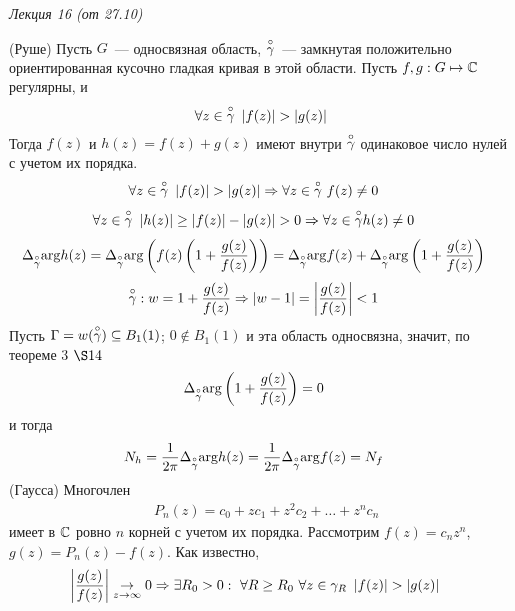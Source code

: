 \begin{flushright}
    \textit{Лекция 16 (от 27.10)}
\end{flushright}
\theorem (Руше)
Пусть $G$~--- односвязная область, $\overset{\circ}{\gamma}$~--- замкнутая положительно
ориентированная кусочно гладкая кривая в этой области. Пусть $f,g: G \mapsto
\mathbb{C}$ регулярны, и
\begin{equation}\label{(20.3)}
    \forall z \in \overset{\circ}{\gamma} \ \left| f(z) \right| > \left| g(z) \right|
\end{equation}
Тогда $f(z)$ и $h(z) = f(z)+g(z)$ имеют внутри $\overset{\circ}{\gamma}$ одинаковое число нулей
с учетом их порядка.
\pr
\begin{align*}
  & \forall z \in \overset{\circ}{\gamma} \ \left| f(z) \right| > \left| g(z) \right| \Rightarrow \forall z \in \overset{\circ}{\gamma} \ f(z) \neq 0
\end{align*}
\begin{align*}
  & \forall z \in \overset{\circ}{\gamma} \ \left| h(z) \right|\geq \left| f(z) \right| - \left| g(z) \right| > 0 \Rightarrow \forall z \in \overset{\circ}{\gamma} h(z) \neq 0
\end{align*}
\begin{align*}
  & \Delta_{\overset{\circ}{\gamma}}\mathrm{arg} h(z) = \Delta_{\overset{\circ}{\gamma}} \mathrm{arg} \left( f(z)\left( 1+\frac{g(z)}{f(z)} \right) \right) = \Delta_{\overset{\circ}{\gamma}}\mathrm{arg} f(z) +\Delta_{\overset{\circ}{\gamma}}\mathrm{arg} \left( 1+\frac{g(z)}{f(z)} \right)
\end{align*}
\begin{align*}
  & \overset{\circ}{\gamma}: w = 1 + \frac{g(z)}{f(z)} \Rightarrow \left| w-1 \right| = \left| \frac{g(z)}{f(z)} \right| < 1
\end{align*}
Пусть $\Gamma = w(\overset{\circ}{\gamma}) \subseteq B_1(1)$; $0 \not \in B_1(1)$ и эта область
односвязна, значит, по теореме $3$ $\S 14$
\begin{align*}
  & \Delta_{\overset{\circ}{\gamma}}\mathrm{arg} \left( 1+\frac{g(z)}{f(z)} \right) = 0
\end{align*}
и тогда
\begin{align*}
  & N_h = \frac{1}{2\pi}\Delta_{\overset{\circ}{\gamma}}\mathrm{arg} h(z) = \frac{1}{2\pi}\Delta_{\overset{\circ}{\gamma}}\mathrm{arg} f(z) = N_f
\end{align*}
\theorem (Гаусса)
Многочлен
\begin{align*}
  & P_n(z) = c_0+zc_1+z^2c_2+\dots+z^nc_n
\end{align*}
имеет в $\mathbb{C}$ ровно $n$ корней с учетом их порядка.
\pr
Рассмотрим $f(z) = c_nz^n$, $g(z) = P_n(z) - f(z)$. Как известно,
\begin{align*}
  & \left| \frac{g(z)}{f(z)} \right| \underset{z \to \infty}{\to} 0 \Rightarrow \exists R_0 > 0: \ \forall R \geq R_0 \ \forall z \in \gamma_R \ \left| f(z) \right| > \left| g(z) \right|
\end{align*}
